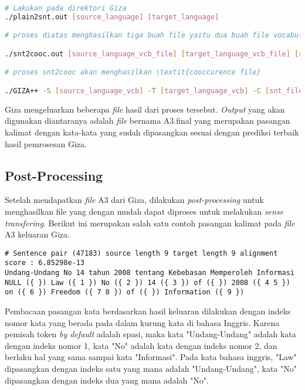 \begin{lstlisting}[language=bash,caption={Word Alignment}, label={word-alignment}]
# Lakukan pada direktori Giza
./plain2snt.out [source_language] [target_language]

# proses diatas menghasilkan tiga buah file yaitu dua buah file vocabulary yang berisi indeks dengan kata (bahasa asal, dan bahasa tujuan), dan satu buah file snt yang berisi \textit{alignment} dari kalimat.

./snt2cooc.out [source_language_vcb_file] [target_language_vcb_file] [snt_file] > [coocurrence_file]

# proses snt2cooc akan menghasilkan \textit{cooccurence file}

./GIZA++ -S [source_language_vcb] -T [target_language_vcb] -C [snt_file] -CoocurrenceFile [cooc_file]
\end{lstlisting}

Giza mengeluarkan beberapa \textit{file} hasil dari proses tersebut. \textit{Output} yang akan digunakan diantaranya adalah \textit{file} bernama A3.final yang merupakan pasangan kalimat dengan kata-kata yang sudah dipasangkan sesuai dengan prediksi terbaik hasil pemrosesan Giza.

\subsection{Post-Processing}
Setelah mendapatkan \textit{file} A3 dari Giza, dilakukan \textit{post-processing} untuk menghasilkan file yang dengan mudah dapat diproses untuk melakukan \textit{sense transfering}. Berikut ini merupakan salah satu contoh pasangan kalimat pada \textit{file} A3 keluaran Giza.

\begin{lstlisting}[backgroundcolor = \color{white}]
# Sentence pair (47183) source length 9 target length 9 alignment score : 6.85298e-13
Undang-Undang No 14 tahun 2008 tentang Kebebasan Memperoleh Informasi 
NULL ({ }) Law ({ 1 }) No ({ 2 }) 14 ({ 3 }) of ({ }) 2008 ({ 4 5 }) on ({ 6 }) Freedom ({ 7 8 }) of ({ }) Information ({ 9 })
\end{lstlisting}

Pembacaan pasangan kata berdasarkan hasil keluaran dilakukan dengan indeks nomor kata yang berada pada dalam kurung kata di bahasa Inggris. Karena pemisah token \textit{by default} adalah spasi, maka kata "Undang-Undang" adalah kata dengan indeks nomor 1, kata "No" adalah kata dengan indeks nomor 2, dan berlaku hal yang sama sampai kata "Informasi". Pada kata bahasa inggris, "Law" dipasangkan dengan indeks satu yang mana adalah "Undang-Undang", kata "No" dipasangkan dengan indeks dua yang mana adalah "No". 

